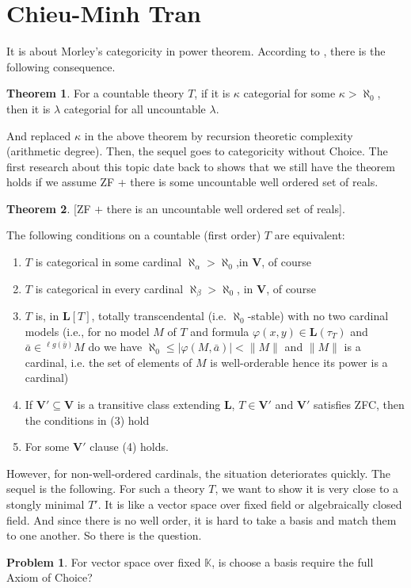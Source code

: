 \documentclass[11pt]{amsart}
\theoremstyle{definition}
\newtheorem{theorem}{Theorem}[section]
\newtheorem{problem}{Problem}[section]
\begin{document}
\section{Chieu-Minh Tran}
It is about Morley's categoricity in power theorem. 
According to \cite{Mor}, there is the following consequence.
\begin{theorem}
    For a countable theory $T$, if it is $\kappa$ categorial for some $\kappa>\aleph_0$, then it is $\lambda$ categorial for all uncountable $\lambda$.
\end{theorem}
And \cite{CM} replaced $\kappa$ in the above theorem by recursion theoretic complexity (arithmetic degree). Then, the sequel goes to  categoricity without Choice. The first research about this topic date back to \cite{She} shows that we still have the theorem holds if we assume ZF + there is some uncountable well ordered set of reals.
\begin{theorem}{[ZF $+$ there is an uncountable well ordered set
of reals].}

The following conditions on a countable (first order) $T$ are equivalent:
    \begin{enumerate}
        \item $T$ is categorical in some cardinal $\aleph_{\alpha} > \aleph_0$,in $\mathbf V$, of course
        \item $T$ is categorical in every cardinal $\aleph_{\beta} > \aleph_0$,
        in $\mathbf V$, of course
        \item $T$ is, in $\mathbf L[T]$, totally transcendental
        (i.e. $\aleph_0$-stable) with no two cardinal models
        (i.e., for no model $M$ of $T$ and formula
        $\varphi(x,y) \in \mathbf L(\tau_T)$ and
        $\bar a \in {}^{\ell g(\bar y)}M$ do we have
        $\aleph_0 \leq |\varphi(M,\bar a)| < \|M\|$
        and $\|M\|$ is a cardinal, i.e. the set of elements of $M$ is well-orderable hence its power is a cardinal)
        \item If $\mathbf V' \subseteq \mathbf V$ is a transitive class extending
        $\mathbf L$, $T \in \mathbf V'$ and $\mathbf V'$ satisfies ZFC, then the conditions in (3) hold
        \item For some $\mathbf V'$ clause (4) holds.
    \end{enumerate}
\end{theorem}

However, for non-well-ordered cardinals, the situation deteriorates quickly. The sequel is the following.
For such a theory $T$, we want to show it is very close to a stongly minimal $T'$. It is like a vector space over fixed field or algebraically closed field. And since there is no well order, it is hard to take a basis and match them to one another. So there is the question.
\begin{problem}
    For vector space over fixed $\mathbb{K}$, is choose a basis require the full Axiom of Choice?
\end{problem}
\end{document}
